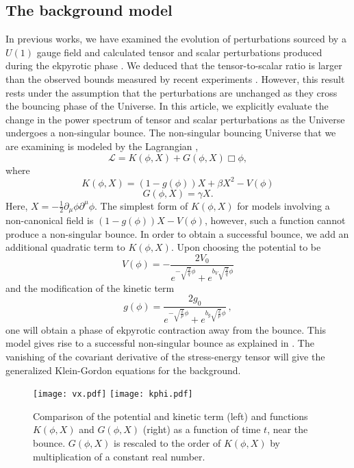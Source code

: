 \documentclass[12pt,a4paper]{article}
\numberwithin{equation}{section}
\numberwithin{equation}{section}
\begin{document}
\subsection{The background model}
In previous works, we have examined the evolution of perturbations sourced by a $U(1)$ gauge field and calculated tensor and scalar perturbations produced during the ekpyrotic phase \cite{r1,r4,Artymowski:2018ewb}. We deduced that the tensor-to-scalar ratio is larger than the observed bounds measured by recent experiments \cite{Paoletti:2022anb}. However, this result rests under the assumption that the perturbations are unchanged as they cross the bouncing phase of the Universe. In this article, we explicitly evaluate the change in the power spectrum of tensor and scalar perturbations as the Universe undergoes a non-singular bounce. The non-singular bouncing Universe that we are examining is modeled by the Lagrangian \cite{Cai:2012va},
\begin{equation}
\mathcal{L} = K(\phi,X)+G(\phi,X)\Box \phi,
\label{eq:sclag}
\end{equation}
where 
\begin{equation}
 K(\phi,X) = (1-g(\phi)) X+ \beta X^2-V(\phi)
 \label{eq:kin}
\end{equation}
\begin{equation}
 G(\phi,X) = \gamma X.
\end{equation}
Here, $X=-\frac{1}{2}\partial_{\mu}\phi \partial^{\mu} \phi$. The simplest form of  $K(\phi,X)$ for models involving a non-canonical field is $(1-g(\phi)) X-V(\phi)$, however, such a function cannot produce a non-singular bounce. In order to obtain a successful bounce, we add an additional quadratic term to $K(\phi,X)$.
Upon choosing the potential to be
\begin{equation}
V(\phi) = -\frac{2V_0}{e^{-\sqrt{\frac{2}{q}}\phi}+e^{b_V\sqrt{\frac{2}{q}}\phi}}
\end{equation}
and the modification of the kinetic term 
\begin{equation}
g(\phi) = \frac{2g_0}{e^{-\sqrt{\frac{2}{p}}\phi}+e^{b_g\sqrt{\frac{2}{p}}\phi}} \, ,
\end{equation}
one will obtain a phase of ekpyrotic contraction away from the bounce. This model gives rise to a successful non-singular bounce as explained in \cite{Cai:2012va}. The vanishing of the covariant derivative of the stress-energy tensor will give the generalized Klein-Gordon equations for the background.
\begin{figure}[H]
    \centering
    \texttt{[image: vx.pdf]} 
    \hfill
    \texttt{[image: kphi.pdf]} 
     \caption{ Comparison of the potential and kinetic term (left) and functions $K(\phi,X)$ and $G(\phi,X)$ (right) as a function of time $t$, near the bounce. $G(\phi,X)$ is rescaled to the order of $K(\phi,X)$ by multiplication of a constant real number.} 
\label{fig:eqxv}
\end{figure}
\end{document}
